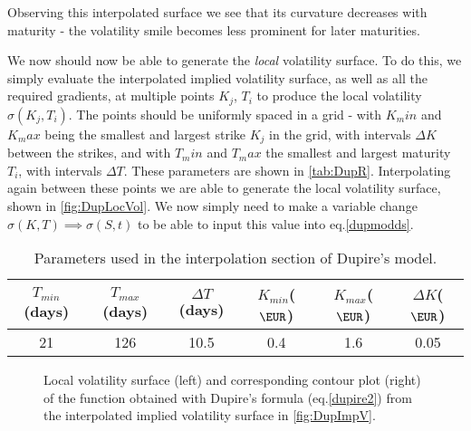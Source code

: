 Observing this interpolated surface we see that its curvature decreases with maturity - the volatility smile becomes less prominent for later maturities.


We now should now be able to generate the \emph{local} volatility surface. To do this, we simply evaluate the interpolated implied volatility surface, as well as all the required gradients, at multiple points $K_j$, $T_i$ to produce the local volatility $\sigma(K_j,T_i)$. The points should be uniformly spaced in a grid - with $K_min$ and $K_max$ being the smallest and largest strike $K_j$ in the grid, with intervals $\Delta K$ between the strikes, and with $T_min$ and $T_max$ the smallest and largest maturity $T_i$, with intervals $\Delta T$. These parameters are shown in \autoref{tab:DupR}.
Interpolating again between these points we are able to generate the local volatility surface, shown in \autoref{fig:DupLocVol}. We now simply need to make a variable change $\sigma(K,T)\implies \sigma(S,t)$ to be able to input this value into eq.\eqref{dupmodds}.


\begin{table}[H]
    \centering
        \renewcommand{\arraystretch}{0.8}
\begin{tabular}{@{}cccccc@{}}
\toprule
$T_{min}$(days) & $T_{max}$(days) & $\Delta T$(days) & $K_{min}$($\EUR$) & $K_{max}$($\EUR$) & \multicolumn{1}{c}{$\Delta K$($\EUR$)}\\ \midrule
21 & 126 & 10.5 & 0.4 & 1.6 & \multicolumn{1}{c}{0.05} \\ \bottomrule
\end{tabular}
  \caption[Parameters used in the interpolation section of Dupire's model.]{Parameters used in the interpolation section of Dupire's model.}
  \label{tab:DupR}
\end{table}


\begin{figure}[H]
  \begin{subfigmatrix}{2}
  \end{subfigmatrix}
    \caption[Local volatility surface and corresponding contour plot of the function obtained with Dupire's formula from the interpolated implied volatility surface.]{Local volatility surface (left) and corresponding contour plot (right) of the function obtained with Dupire's formula (eq.\eqref{dupire2}) from the interpolated implied volatility surface in \autoref{fig:DupImpV}.}\label{fig:DupLocVol}
\end{figure}   

